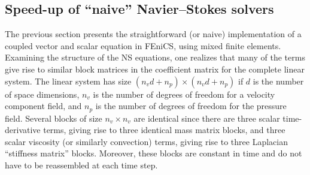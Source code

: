 \subsection{Speed-up of ``naive'' Navier--Stokes solvers}
\label{sec:mortensen:speed-up}

The previous section presents the straightforward (or naive)
implementation of a coupled vector and scalar equation in FEniCS, using
mixed finite elements.  Examining the structure of the NS equations, one
realizes that many of the terms give rise to similar block matrices in
the coefficient matrix for the complete linear system. The linear system
has size $(n_vd + n_p) \times (n_vd + n_p)$ if $d$ is the number of space
dimensions, $n_v$ is the number of degrees of freedom for a velocity
component field, and $n_p$ is the number of degrees of freedom for the
pressure field.  Several blocks of size $n_v\times n_v$ are identical
since there are three scalar time-derivative terms, giving rise to three
identical mass matrix blocks, and three scalar viscosity (or similarly
convection) terms, giving rise to three Laplacian ``stiffness matrix''
blocks.  Moreover, these blocks are constant in time and do not have to
be reassembled at each time step.

